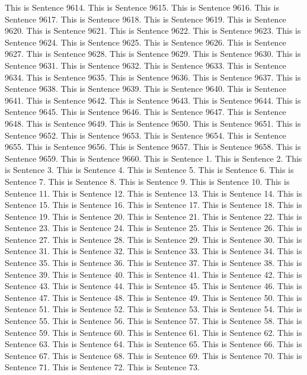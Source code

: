 \documentclass{article}
\begin{document}
This is Sentence 9614.
This is Sentence 9615.
This is Sentence 9616.
This is Sentence 9617.
This is Sentence 9618.
This is Sentence 9619.
This is Sentence 9620.
This is Sentence 9621.
This is Sentence 9622.
This is Sentence 9623.
This is Sentence 9624.
This is Sentence 9625.
This is Sentence 9626.
This is Sentence 9627.
This is Sentence 9628.
This is Sentence 9629.
This is Sentence 9630.
This is Sentence 9631.
This is Sentence 9632.
This is Sentence 9633.
This is Sentence 9634.
This is Sentence 9635.
This is Sentence 9636.
This is Sentence 9637.
This is Sentence 9638.
This is Sentence 9639.
This is Sentence 9640.
This is Sentence 9641.
This is Sentence 9642.
This is Sentence 9643.
This is Sentence 9644.
This is Sentence 9645.
This is Sentence 9646.
This is Sentence 9647.
This is Sentence 9648.
This is Sentence 9649.
This is Sentence 9650.
This is Sentence 9651.
This is Sentence 9652.
This is Sentence 9653.
This is Sentence 9654.
This is Sentence 9655.
This is Sentence 9656.
This is Sentence 9657.
This is Sentence 9658.
This is Sentence 9659.
This is Sentence 9660.
This is Sentence 1.
This is Sentence 2.
This is Sentence 3.
This is Sentence 4.
This is Sentence 5.
This is Sentence 6.
This is Sentence 7.
This is Sentence 8.
This is Sentence 9.
This is Sentence 10.
This is Sentence 11.
This is Sentence 12.
This is Sentence 13.
This is Sentence 14.
This is Sentence 15.
This is Sentence 16.
This is Sentence 17.
This is Sentence 18.
This is Sentence 19.
This is Sentence 20.
This is Sentence 21.
This is Sentence 22.
This is Sentence 23.
This is Sentence 24.
This is Sentence 25.
This is Sentence 26.
This is Sentence 27.
This is Sentence 28.
This is Sentence 29.
This is Sentence 30.
This is Sentence 31.
This is Sentence 32.
This is Sentence 33.
This is Sentence 34.
This is Sentence 35.
This is Sentence 36.
This is Sentence 37.
This is Sentence 38.
This is Sentence 39.
This is Sentence 40.
This is Sentence 41.
This is Sentence 42.
This is Sentence 43.
This is Sentence 44.
This is Sentence 45.
This is Sentence 46.
This is Sentence 47.
This is Sentence 48.
This is Sentence 49.
This is Sentence 50.
This is Sentence 51.
This is Sentence 52.
This is Sentence 53.
This is Sentence 54.
This is Sentence 55.
This is Sentence 56.
This is Sentence 57.
This is Sentence 58.
This is Sentence 59.
This is Sentence 60.
This is Sentence 61.
This is Sentence 62.
This is Sentence 63.
This is Sentence 64.
This is Sentence 65.
This is Sentence 66.
This is Sentence 67.
This is Sentence 68.
This is Sentence 69.
This is Sentence 70.
This is Sentence 71.
This is Sentence 72.
This is Sentence 73.
\end{document}
